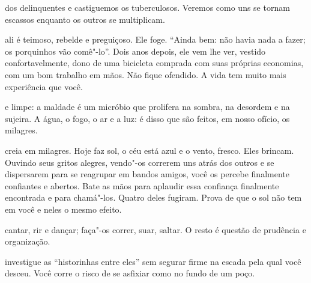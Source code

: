  dos delinquentes e castiguemos os tuberculosos. Veremos como
uns se tornam escassos enquanto os outros se multiplicam.



 ali é teimoso, rebelde e preguiçoso. Ele foge. ``Ainda bem: não
havia nada a fazer; os porquinhos vão comê"-lo''. Dois anos depois, ele
vem lhe ver, vestido confortavelmente, dono de uma bicicleta comprada
com suas próprias economias, com um bom trabalho em mãos. Não fique
ofendido. A vida tem muito mais experiência que você.

\pagebreak


 e limpe: a maldade é um micróbio que prolifera na sombra, na
desordem e na sujeira. A água, o fogo, o ar e a luz: é disso que são
feitos, em nosso ofício, os milagres.



 creia em milagres. Hoje faz sol, o céu está azul e o vento, fresco.
Eles brincam. Ouvindo seus gritos alegres, vendo"-os correrem uns atrás
dos outros e se dispersarem para se reagrupar em bandos amigos, você os
percebe finalmente confiantes e abertos. Bate as mãos para aplaudir essa
confiança finalmente encontrada e para chamá"-los. Quatro deles fugiram.
Prova de que o sol não tem em você e neles o mesmo efeito.



 cantar, rir e dançar; faça"-os correr, suar, saltar. O resto é
questão de prudência e organização.



 investigue as ``historinhas entre eles'' sem segurar firme na escada
pela qual você desceu. Você corre o risco de se asfixiar como no fundo
de um poço.



\pagebreak
\thispagestyle{empty}

